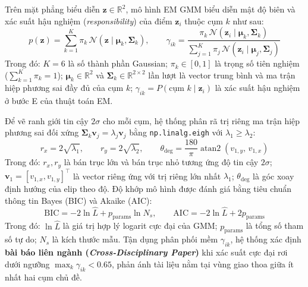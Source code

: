 Trên mặt phẳng biểu diễn $\mathbf{z} \in \mathbb{R}^2$, mô hình EM GMM biểu diễn mật độ biên và xác suất hậu nghiệm (\textit{responsibility}) của điểm $\mathbf{z}_i$ thuộc cụm $k$ như sau:
\begin{equation}
  p(\mathbf{z}) = \sum_{k=1}^{K} \pi_k \, \mathcal{N}(\mathbf{z} \mid \boldsymbol{\mu}_k, \boldsymbol{\Sigma}_k),
  \qquad
  \gamma_{ik} = \frac{\pi_k \, \mathcal{N}(\mathbf{z}_i \mid \boldsymbol{\mu}_k, \boldsymbol{\Sigma}_k)}{\sum_{j=1}^{K} \pi_j \, \mathcal{N}(\mathbf{z}_i \mid \boldsymbol{\mu}_j, \boldsymbol{\Sigma}_j)}
  \label{eq:ch4_gmm_em}
\end{equation}
Trong đó: $K = 6$ là số thành phần Gaussian; $\pi_k \in [0, 1]$ là trọng số tiên nghiệm ($\sum_{k=1}^K \pi_k = 1$); $\boldsymbol{\mu}_k \in \mathbb{R}^2$ và $\boldsymbol{\Sigma}_k \in \mathbb{R}^{2 \times 2}$ lần lượt là vector trung bình và ma trận hiệp phương sai đầy đủ của cụm $k$; $\gamma_{ik} = P(\text{cụm } k \mid \mathbf{z}_i)$ là xác suất hậu nghiệm ở bước E của thuật toán EM.

Để vẽ ranh giới tin cậy $2\sigma$ cho mỗi cụm, hệ thống phân rã trị riêng ma trận hiệp phương sai đối xứng $\boldsymbol{\Sigma}_k \mathbf{v}_j = \lambda_j \mathbf{v}_j$ bằng \texttt{np.linalg.eigh} với $\lambda_1 \ge \lambda_2$:
\begin{equation}
  r_x = 2\sqrt{\lambda_1},
  \qquad
  r_y = 2\sqrt{\lambda_2},
  \qquad
  \theta_{\deg} = \frac{180}{\pi} \operatorname{atan2}(v_{1,y},\, v_{1,x})
  \label{eq:ch4_gmm_ellipse}
\end{equation}
Trong đó: $r_x, r_y$ là bán trục lớn và bán trục nhỏ tương ứng độ tin cậy $2\sigma$; $\mathbf{v}_1 = [v_{1,x}, v_{1,y}]^\top$ là vector riêng ứng với trị riêng lớn nhất $\lambda_1$; $\theta_{\deg}$ là góc xoay định hướng của elip theo độ. Độ khớp mô hình được đánh giá bằng tiêu chuẩn thông tin Bayes (BIC) và Akaike (AIC):
\begin{equation}
  \mathrm{BIC} = -2 \ln \hat{L} + p_{\text{params}} \ln N_s,
  \qquad
  \mathrm{AIC} = -2 \ln \hat{L} + 2 p_{\text{params}}
  \label{eq:ch4_bic_aic}
\end{equation}
Trong đó: $\ln \hat{L}$ là giá trị hợp lý logarit cực đại của GMM; $p_{\text{params}}$ là tổng số tham số tự do; $N_s$ là kích thước mẫu. Tận dụng phân phối mềm $\gamma_{ik}$, hệ thống xác định \textbf{bài báo liên ngành (\textit{Cross-Disciplinary Paper})} khi xác suất cực đại rơi dưới ngưỡng $\max_k \gamma_{ik} < 0.65$, phản ánh tài liệu nằm tại vùng giao thoa giữa ít nhất hai cụm chủ đề.

